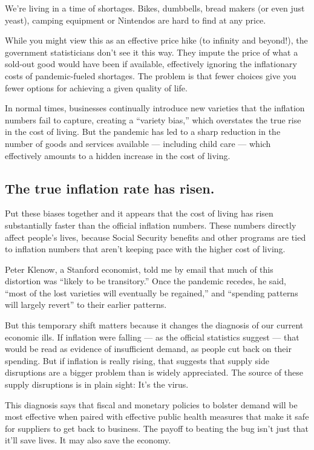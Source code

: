 We're living in a time of shortages. Bikes, dumbbells, bread makers (or
even just yeast), camping equipment or Nintendos are hard to find at any
price.

While you might view this as an effective price hike (to infinity and
beyond!), the government statisticians don't see it this way. They
impute the price of what a sold-out good would have been if available,
effectively ignoring the inflationary costs of pandemic-fueled
shortages. The problem is that fewer choices give you fewer options for
achieving a given quality of life.

In normal times, businesses continually introduce new varieties that the
inflation numbers fail to capture, creating a ``variety bias,'' which
overstates the true rise in the cost of living. But the pandemic has led
to a sharp reduction in the number of goods and services available ---
including child care --- which effectively amounts to a hidden increase
in the cost of living.

\hypertarget{the-true-inflation-rate-has-risen}{%
\subsection{The true inflation rate has
risen.}\label{the-true-inflation-rate-has-risen}}

Put these biases together and it appears that the cost of living has
risen substantially faster than the official inflation numbers. These
numbers directly affect people's lives, because Social Security benefits
and other programs are tied to inflation numbers that aren't keeping
pace with the higher cost of living.

Peter Klenow, a Stanford economist, told me by email that much of this
distortion was ``likely to be transitory.'' Once the pandemic recedes,
he said, ``most of the lost varieties will eventually be regained,'' and
``spending patterns will largely revert'' to their earlier patterns.

But this temporary shift matters because it changes the diagnosis of our
current economic ills. If inflation were falling --- as the official
statistics suggest --- that would be read as evidence of insufficient
demand, as people cut back on their spending. But if inflation is really
rising, that suggests that supply side disruptions are a bigger problem
than is widely appreciated. The source of these supply disruptions is in
plain sight: It's the virus.

This diagnosis says that fiscal and monetary policies to bolster demand
will be most effective when paired with effective public health measures
that make it safe for suppliers to get back to business. The payoff to
beating the bug isn't just that it'll save lives. It may also save the
economy.

